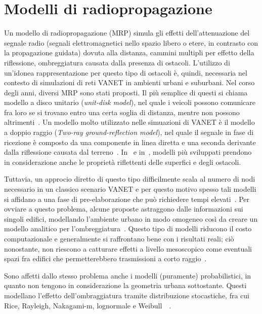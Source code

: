 \section{Modelli di radiopropagazione}\label{sec:modelli-propagazione}
Un modello di radiopropagazione (MRP) simula gli effetti dell'attenuazione del segnale radio (segnali elettromagnetici nello spazio libero o etere, in contrasto con la propagazione guidata)
dovuta alla distanza, cammini multipli per effetto della riflessione, ombreggiatura causata dalla presenza di ostacoli.
L'utilizzo di un'idonea rappresentazione per questo tipo di ostacoli è, quindi, necessaria nel contesto di simulazioni di reti VANET in ambienti urbani
e suburbani.
Nel corso degli anni, diversi MRP sono stati proposti.
Il più semplice di questi si chiama modello a disco unitario (\textit{unit-disk model}), nel quale i veicoli possono comunicare fra loro se si trovano entro una certa soglia
di distanza, mentre non possono altrimenti~\cite{6554832}.
Un modello molto utilizzato nelle simuazioni di VANET è il modello a doppio raggio (\textit{Two-ray ground-reflection model}),
nel quale il segnale in fase di ricezione è composto da una componente in linea diretta e una seconda derivante dalla riflessione causata dal terreno~\cite{DBLP:books/daglib/0091821}.
In~\cite{Schmitz:2006:ERW:1164717.1164730} e in~\cite{Souley2005RealisticUS}, modelli più sviluppati prendono in considerazione anche le proprietà riflettenti delle superfici e degli ostacoli.

Tuttavia, un approcio diretto di questo tipo difficilmente scala al numero di nodi necessario in un classico scenario VANET e per questo motivo
spesso tali modelli si affidano a una fase di pre-elaborazione che può richiedere tempi elevati~\cite{Stepanov:2008:IMR:1293378.1293656}.
Per ovviare a questo problema, alcune proposte astraggono dalle informazioni sui singoli edifici, modellando l'ambiente urbano in modo omogeneo
così da creare un modello analitico per l'ombreggiatura~\cite{1492678}.
Questo tipo di modelli riducono il costo computazionale e generalmente si raffrontano bene con i risultati reali;
ciò nonostante, non riescono a catturare effetti a livello mesoscopico come eventuali spazi fra edifici che permetterebbero trasmissioni a corto raggio~\cite{Giordano:2010:CST:1860058.1860065}.

Sono affetti dallo stesso problema anche i modelli (puramente) probabilistici, in quanto non tengono in considerazione la geometria urbana sottostante.
Questi modellano l'effetto dell'ombraggiatura tramite distribuzione stocastiche, fra cui Rice, Rayleigh, Nakagami-m, lognormale e Weibull~\cite{6554832}~\cite{Rappaport:2001:WCP:559977}.
%
